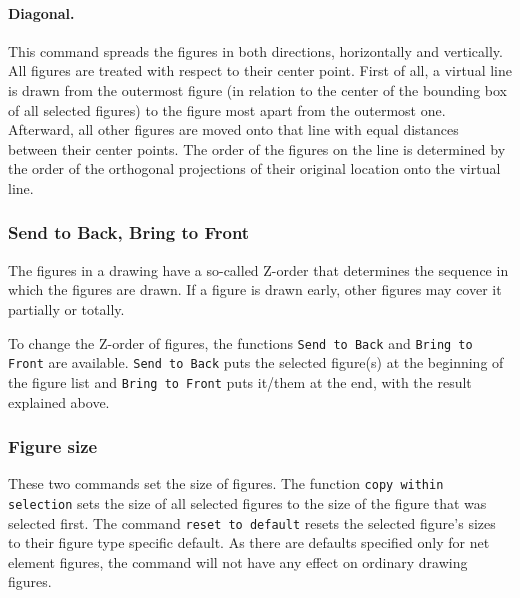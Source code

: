 \paragraph{Diagonal.}
This command spreads the figures in both directions, horizontally and
vertically.
All figures are treated with respect to their center point.
First of all, a virtual line is drawn from the outermost figure (in
relation to the center of the bounding box of all selected
figures) to the figure most apart from the outermost one.
Afterward, all other figures are moved onto that line with equal distances
between their center points.
The order of the figures on the line is determined by the
order of the orthogonal projections of their original location onto the
virtual line.

\subsubsection{Send to Back, Bring to Front}

The figures in a drawing have a so-called Z-order that determines
the sequence in which the figures are drawn.
If a figure is drawn early, other figures may cover it partially
or totally.

To change the Z-order of figures, the functions \texttt{Send to Back}
and \texttt{Bring to Front} are available. \texttt{Send to Back}
puts the selected figure(s) at the beginning of the figure list and
\texttt{Bring to Front} puts it/them at the end, with the result
explained above.



\subsubsection{Figure size}

These two commands set the size of figures.
The function \texttt{copy within selection} sets
the size of all selected figures to the size of
the figure that was selected first.
The command \texttt{reset to default} resets the selected
figure's sizes to their figure type specific default. As there
are defaults specified only for net element figures, the command
will not have any effect on ordinary drawing figures.



